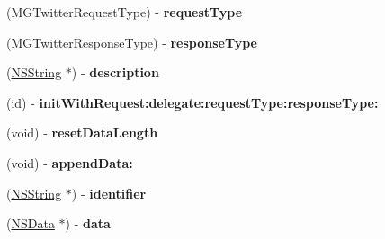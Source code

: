 \begin{DoxyCompactItemize}
\item 
\hypertarget{interface_m_g_twitter_h_t_t_p_u_r_l_connection_a952eebcbec9734d32b072d2ff485f5f0}{
(\-M\-G\-Twitter\-Request\-Type) -\/ {\bfseries request\-Type}}
\label{interface_m_g_twitter_h_t_t_p_u_r_l_connection_a952eebcbec9734d32b072d2ff485f5f0}

\item 
\hypertarget{interface_m_g_twitter_h_t_t_p_u_r_l_connection_aee2fd0626110aeeca0ecc642fe069292}{
(\-M\-G\-Twitter\-Response\-Type) -\/ {\bfseries response\-Type}}
\label{interface_m_g_twitter_h_t_t_p_u_r_l_connection_aee2fd0626110aeeca0ecc642fe069292}

\item 
\hypertarget{interface_m_g_twitter_h_t_t_p_u_r_l_connection_a51f3bc21958c3ad70c99696c3f094041}{
(\hyperlink{class_n_s_string}{\-N\-S\-String} $\ast$) -\/ {\bfseries description}}
\label{interface_m_g_twitter_h_t_t_p_u_r_l_connection_a51f3bc21958c3ad70c99696c3f094041}

\item 
\hypertarget{interface_m_g_twitter_h_t_t_p_u_r_l_connection_ae9f49aec475cdb37ba4d7b13b714676e}{
(id) -\/ {\bfseries init\-With\-Request\-:delegate\-:request\-Type\-:response\-Type\-:}}
\label{interface_m_g_twitter_h_t_t_p_u_r_l_connection_ae9f49aec475cdb37ba4d7b13b714676e}

\item 
\hypertarget{interface_m_g_twitter_h_t_t_p_u_r_l_connection_aab2b67bae8793a2b01722e0247874251}{
(void) -\/ {\bfseries reset\-Data\-Length}}
\label{interface_m_g_twitter_h_t_t_p_u_r_l_connection_aab2b67bae8793a2b01722e0247874251}

\item 
\hypertarget{interface_m_g_twitter_h_t_t_p_u_r_l_connection_a9e6f7ee990f377401643e299704767f7}{
(void) -\/ {\bfseries append\-Data\-:}}
\label{interface_m_g_twitter_h_t_t_p_u_r_l_connection_a9e6f7ee990f377401643e299704767f7}

\item 
\hypertarget{interface_m_g_twitter_h_t_t_p_u_r_l_connection_a4fc426b6d9956d3ddeb4cfb434021ed8}{
(\hyperlink{class_n_s_string}{\-N\-S\-String} $\ast$) -\/ {\bfseries identifier}}
\label{interface_m_g_twitter_h_t_t_p_u_r_l_connection_a4fc426b6d9956d3ddeb4cfb434021ed8}

\item 
\hypertarget{interface_m_g_twitter_h_t_t_p_u_r_l_connection_aa6bf8a3f759ac8b2f67773eb2002691f}{
(\hyperlink{class_n_s_data}{\-N\-S\-Data} $\ast$) -\/ {\bfseries data}}
\label{interface_m_g_twitter_h_t_t_p_u_r_l_connection_aa6bf8a3f759ac8b2f67773eb2002691f}


\end{DoxyCompactItemize}

